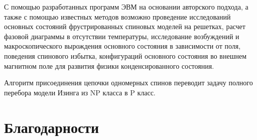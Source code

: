 \documentclass[utf8, babel, sor, jor, amsmath, amssymb, reprint]{elsarticle} %
\begin{document}
С помощью разработанных программ ЭВМ на основании авторского подхода, а также с помощью известных методов возможно проведение исследований основных состояний фрустрированных спиновых моделей на решетках, расчет фазовой диаграммы в отсутствии температуры, исследование возбуждений и макроскопического вырождения основного состояния в зависимости от поля, поведения спинового избытка, конфигураций основного состояния во внешнем магнитном поле для развития физики конденсированного состояния.

Алгоритм присоединения цепочки одномерных спинов переводит задачу полного перебора модели Изинга из NP класса в P класс.



\section{Благодарности}

 


\end{document}
